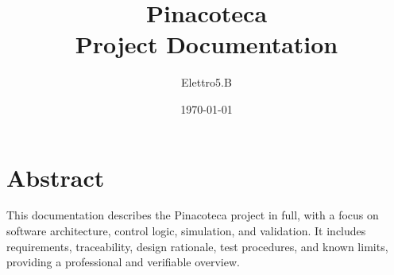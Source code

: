 \documentclass[11pt,a4paper]{report}
\title{Pinacoteca\\Project Documentation}
\author{Elettro5.B}
\date{\today}
\begin{document}
\hypersetup{pageanchor=false}
\maketitle
\thispagestyle{empty}
\chapter*{Abstract}
This documentation describes the Pinacoteca project in full, with a focus on software architecture, control logic, simulation, and validation. It includes requirements, traceability, design rationale, test procedures, and known limits, providing a professional and verifiable overview.
\tableofcontents
\clearpage
{}
\hypersetup{pageanchor=true}
























\end{document}
